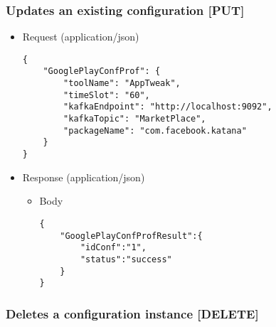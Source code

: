 \subsubsection{Updates an existing configuration
{[}PUT{]}}\label{updates-an-existing-configuration-put}

\begin{itemize}
\item
  Request (application/json)

\begin{verbatim}
{
    "GooglePlayConfProf": {
        "toolName": "AppTweak",
        "timeSlot": "60",
        "kafkaEndpoint": "http://localhost:9092",
        "kafkaTopic": "MarketPlace",
        "packageName": "com.facebook.katana"
    }
}
\end{verbatim}
\item
  Response (application/json)

  \begin{itemize}
  \item
    Body

\begin{verbatim}
{
    "GooglePlayConfProfResult":{
        "idConf":"1",
        "status":"success"
    }
}
\end{verbatim}
  \end{itemize}
\end{itemize}

\subsubsection{Deletes a configuration instance
{[}DELETE{]}}\label{deletes-a-configuration-instance-delete}